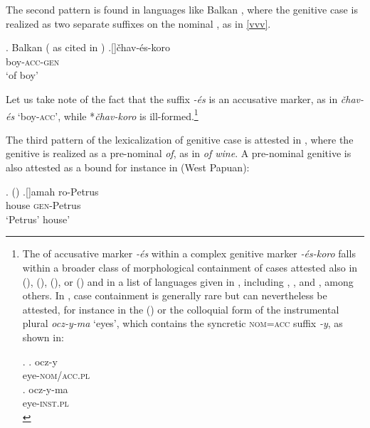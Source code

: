 \noindent The second pattern is found in languages like Balkan , where the genitive case is realized as two separate suffixes on the nominal , as in \ref{vvv}.

\ex.  Balkan  (\citealt[57]{Friedman1991} as cited in \citealt{Caha2011})\label{vvv}
\ag.[]\hspace{-20pt}\v{c}hav-\'es-koro\\
\hspace{-20pt}boy-\textsc{acc-gen}\\
\hspace{-20pt}`of boy' 

Let us take note of the fact that the suffix \textit{-\'es} is an accusative marker, as in \textit{\v{c}hav-\'es} `boy-\textsc{acc}', while *\textit{\v{c}hav-koro} is ill-formed.\footnote{The  of accusative marker \textit{-\'es} within a complex genitive marker \textit{-\'es-koro} falls within a broader class of morphological containment of cases attested also in  
 (\citealt{Nichols1994}),  (\citealt{Blevins2008}),  (\citealt{Plakendorf2007}), or  (\citealt{Schmitt1981,Caha2013}) and in a list of languages given in \cite{Plank1999}, including , , and , among others. In , case containment is generally rare but can nevertheless be attested, for instance in the  (\citealt{Caha2011b}) or the colloquial form of the  instrumental plural \textit{ocz-y-ma} `eyes', which contains the syncretic \textsc{nom=acc} suffix \textit{-y}, as shown in: 

\noindent\parbox{\linguexfootnotewidth}{%
\ex. 
\ag. ocz-y\\
eye-\textsc{nom/acc.pl}\\
\bg. ocz-y-ma\\
eye-\textsc{inst.pl}\\

}
} %
\par
The third pattern of the lexicalization of genitive case is attested in , where the genitive is realized as a pre-nominal \textit{of}, as in \textit{of wine}. A pre-nominal genitive is also attested as a bound  for instance in  (West Papuan):

\ex.  (\citealt[97]{Dol1999})
\ag.[]\hspace{-20pt}amah ro-Petrus\\
\hspace{-20pt}house \textsc{gen}-Petrus\\
\hspace{-20pt}`Petrus' house'


